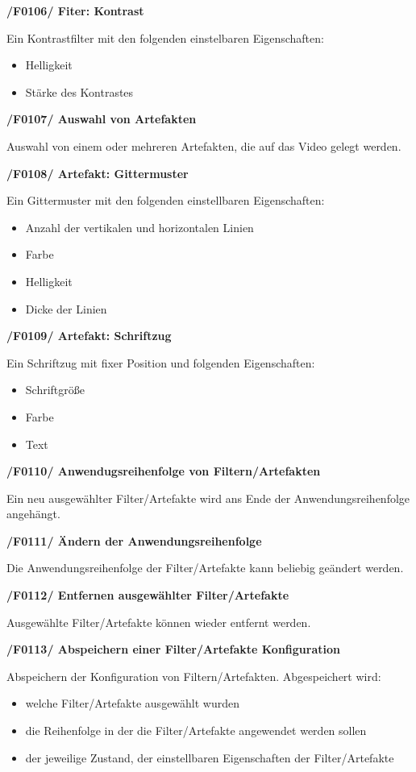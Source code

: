 \documentclass[parskip=full]{scrartcl}
\begin{document}
\textbf{/F0106/ Fiter: Kontrast}

Ein Kontrastfilter mit den folgenden einstelbaren Eigenschaften:
\begin{itemize}
\item Helligkeit
\item Stärke des Kontrastes
\end{itemize}

\textbf{/F0107/ Auswahl von Artefakten}

Auswahl von einem oder mehreren Artefakten, die auf das Video gelegt werden.

\textbf{/F0108/ Artefakt: Gittermuster}

Ein Gittermuster mit den folgenden einstellbaren Eigenschaften:
\begin{itemize}
\item Anzahl der vertikalen und horizontalen Linien
\item Farbe
\item Helligkeit
\item Dicke der Linien
\end{itemize}
\newpage
\textbf{/F0109/ Artefakt: Schriftzug}

Ein Schriftzug mit fixer Position und folgenden Eigenschaften:
\begin{itemize}
\item Schriftgröße
\item Farbe
\item Text
\end{itemize}

\textbf{/F0110/ Anwendugsreihenfolge von Filtern/Artefakten}

Ein neu ausgewählter Filter/Artefakte wird ans Ende der Anwendungsreihenfolge angehängt.

\textbf{/F0111/ Ändern der Anwendungsreihenfolge}

Die Anwendungsreihenfolge der Filter/Artefakte kann beliebig geändert werden.

\textbf{/F0112/ Entfernen ausgewählter Filter/Artefakte}

Ausgewählte Filter/Artefakte können wieder entfernt werden.

\textbf{/F0113/ Abspeichern einer Filter/Artefakte Konfiguration}

Abspeichern der Konfiguration von Filtern/Artefakten. Abgespeichert wird:
\begin{itemize}
\item welche Filter/Artefakte ausgewählt wurden
\item die Reihenfolge in der die Filter/Artefakte angewendet werden sollen
\item der jeweilige Zustand, der einstellbaren Eigenschaften der Filter/Artefakte
\end{itemize}
\end{document}
